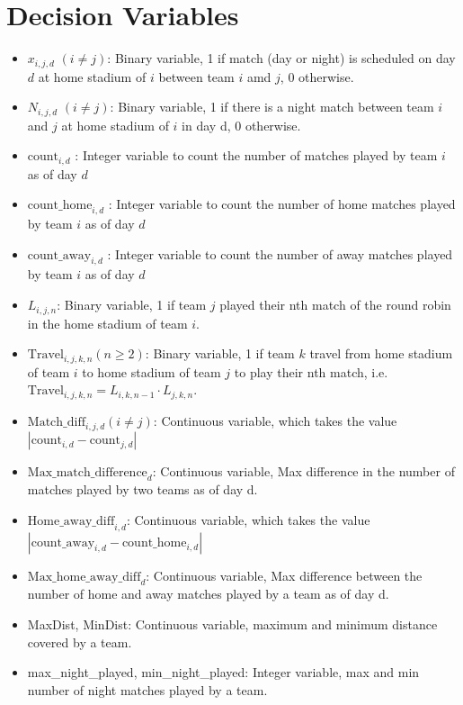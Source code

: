 \documentclass[a4paper, 12pt]{article}
\begin{document}
\section*{Decision Variables}
\begin{itemize}
    \item $x_{i,j,d}$ $(i \neq j)$: Binary variable, 1 if match (day or night) is scheduled on day $d$ at home stadium of $i$ between team $i$ amd $j$, 0 otherwise.
    \item $N_{i,j,d}$ $(i \neq j)$: Binary variable, 1 if there is a night match between team $i$ and $j$ at home stadium of $i$ in day d, 0 otherwise.
    \item $\text{count}_{i,d}$ : Integer variable to count the number of matches played by team $i$ as of day $d$
    \item $\text{count\_home}_{i,d}$ : Integer variable to count the number of home matches played by team $i$ as of day $d$
    \item $\text{count\_away}_{i,d}$ : Integer variable to count the number of away matches played by team $i$ as of day $d$
    \item $L_{i,j,n}$: Binary variable, 1 if team $j$ played their nth match of the round robin in the home stadium of team $i$.
    \item $\text{Travel}_{i,j,k,n} (n \geq 2)$: Binary variable, 1 if team $k$ travel from home stadium of team $i$ to home stadium of team $j$ to play their nth match, i.e. $\text{Travel}_{i,j,k,n} = L_{i,k,n-1}\cdot L_{j,k,n}$.
    \item $\text{Match\_diff}_{i,j,d} (i \neq j)$: Continuous variable, which takes the value $|\text{count}_{i,d} - \text{count}_{j,d}|$ 
    \item $\text{Max\_match\_difference}_{d}$: Continuous variable, Max difference in the number of matches played by two teams as of day d.
    \item $\text{Home\_away\_diff}_{i,d}$: Continuous variable, which takes the value $|\text{count\_away}_{i,d} - \text{count\_home}_{i,d}|$ 
    \item $\text{Max\_home\_away\_diff}_{d}$: Continuous variable, Max  difference between the number of home and away matches played by a team as of day d. 
    \item MaxDist, MinDist: Continuous variable, maximum and minimum distance covered by a team.
    \item max\_night\_played, min\_night\_played: Integer variable, max and min number of night matches played by a team.

\end{itemize}
\end{document}
